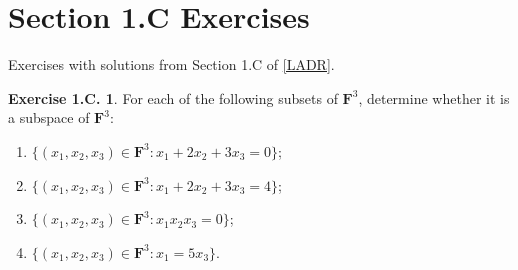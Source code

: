 \documentclass[12pt]{article}
\theoremstyle{definition}
\theoremstyle{exercise}
\newtheorem{exercise}{Exercise 1.C.}
\theoremstyle{solution}
\newcommand{\F}{\mathbf{F}}
\begin{document}
\section{Section 1.C Exercises}

Exercises with solutions from Section 1.C of \hyperlink{ladr}{[LADR]}.

\begin{exercise}
\label{ex:1}
    For each of the following subsets of \( \F^3 \), determine whether it is a subspace of \( \F^3 \):
    \begin{enumerate}
        \item \( \{ (x_1, x_2, x_3) \in \F^3 : x_1 + 2 x_2 + 3 x_3 = 0 \} \);

        \item \( \{ (x_1, x_2, x_3) \in \F^3 : x_1 + 2 x_2 + 3 x_3 = 4 \} \);

        \item \( \{ (x_1, x_2, x_3) \in \F^3 : x_1 x_2 x_3 = 0 \} \);

        \item \( \{ (x_1, x_2, x_3) \in \F^3 : x_1 = 5 x_3 \} \).
    \end{enumerate}
\end{exercise}
\end{document}
